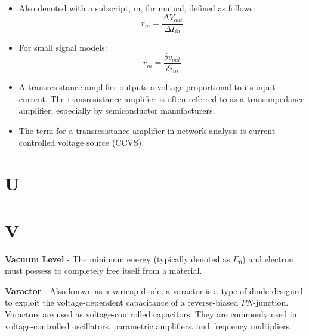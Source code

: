     \begin{itemize}
        \setlength\itemsep{0.5em}
        \item{Also denoted with a subscript, m, for mutual, defined as follows:}
            \begin{equation}
                r_m = \frac{\Delta V_{out}}{\Delta I_{in}}
            \end{equation}
        \item{For small signal models:}
            \begin{equation}
                r_m = \frac{\delta v_{out}}{\delta i_{in}}
            \end{equation}
        \item{A transresistance amplifier outputs a voltage proportional to its input current. The transresistance amplifier is often referred to as a transimpedance amplifier, especially by semiconductor manufacturers.}
        \item{The term for a transresistance amplifier in network analysis is current controlled voltage source (CCVS).}
    \end{itemize}
\section{U}
\section{V}
    \textbf{Vacuum Level} - The minimum energy (typically denoted as $E_0$) and electron must possess to completely free itself from a material.

\vspace{0.5cm}
    \textbf{Varactor} - Also known as a varicap diode, a varactor is a type of diode designed to exploit the voltage-dependent capacitance of a reverse-biased $PN$-junction.  Varactors are used as voltage-controlled capacitors. They are commonly used in voltage-controlled oscillators, parametric amplifiers, and frequency multipliers.


